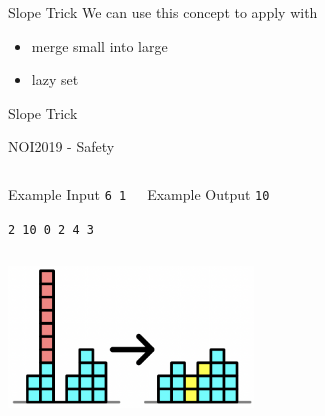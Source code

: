 \documentclass[aspectratio=169,xcolor=dvipsnames]{beamer}
\begin{document}
\begin{frame}[t, plain]{Slope Trick}
We can use this concept to apply with
\pause
\begin{itemize}
    \item merge small into large
    \pause
    \item lazy set
\end{itemize}

\end{frame}

\begin{frame}[t, plain]{Slope Trick}
\begin{Large}
NOI2019 - Safety
\end{Large}
\begin{columns}[c] %

        \begin{alertblock}{Example Input}
\texttt{6 1}

\texttt{2 10 0 2 4 3}
\end{alertblock}
        \begin{alertblock}{Example Output}
\texttt{10}

\texttt{}
\end{alertblock}
\end{columns}

\begin{center}
\includegraphics[width=6.5cm]{safety.png}
\end{center}

\end{frame}
\end{document}
